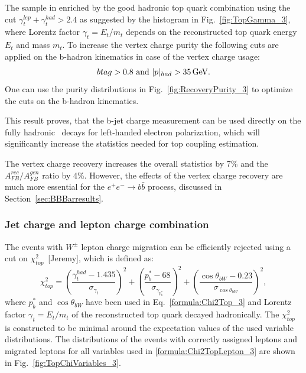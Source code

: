 The sample in enriched by the good hadronic top quark combination using the cut $\gamma^{lep}_t + \gamma^{had}_t > 2.4$ as suggested by the histogram in Fig.~\ref{fig:TopGamma_3}, where Lorentz factor $\gamma_t = E_t / m_t$ depends on the reconstructed top quark energy $E_t$ and mass $m_t$.
To increase the vertex charge purity the following cuts are applied on the b-hadron kinematics in case of the vertex charge usage:
\begin{equation}
btag > 0.8\text{ and } |p|_{had} > 35\text{\,GeV}.
\end{equation}
One can use the purity distributions in Fig.~\ref{fig:RecoveryPurity_3} to optimize the cuts on the b-hadron kinematics. 

This result proves, that the  b-jet charge measurement can be used directly on the fully hadronic \ttbar\ decays for left-handed electron polarization, which will significantly increase the statistics needed for top coupling estimation. 

The vertex charge recovery increases the overall statistics by 7\% and the $A_{FB}^{rec}/A^{gen}_{FB}$ ratio by 4\%. 
However, the effects of the vertex charge recovery are much more essential for the $e^+e^-\to b\bar{b}$ process, discussed in Section~\ref{sec:BBBarresults}.

\subsubsection{Jet charge and lepton charge combination}
\label{sec:JetChargeCombo}
The events with $W^\pm$ lepton charge migration can be efficiently rejected using  a cut on $\chi^2_{top}$~[Jeremy], which is defined as:
\begin{equation}
	\label{formula:Chi2TopLepton_3}
	\chi^2_{top} = (\frac{\gamma_t^{had}-1.435}{\sigma_{\gamma_{t}}})^2 + (\frac{p^*_b-68}{\sigma_{\gamma_{p^*_b}}})^2 + (\frac{\cos\theta_{bW} - 0.23}{\sigma_{\cos\theta_{bW}}})^2,
\end{equation}
where $p^*_b$ and $\cos\theta_{bW}$ have been used in Eq.~\ref{formula:Chi2Top_3} and Lorentz factor $\gamma_t=E_{t}/m_{t}$ of the reconstructed top quark decayed hadronically. The $\chi^2_{top}$ is constructed to be minimal around the expectation values of the used variable distributions.
The distributions of the events with correctly assigned leptons and migrated leptons for all variables used in \ref{formula:Chi2TopLepton_3} are shown in Fig.~\ref{fig:TopChiVariables_3}.


